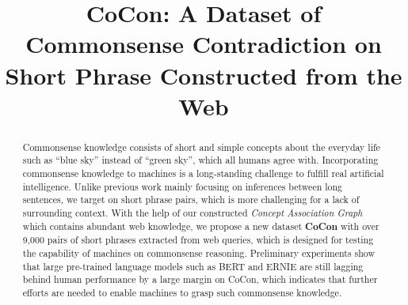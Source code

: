 \documentclass[sigconf]{acmart}
\newcommand{\KZ}[1]{\textcolor{red}{Kenny: #1}}
\begin{document}
	\fancyhead{}
	\title{CoCon: A Dataset of Commonsense Contradiction on Short Phrase Constructed from the Web}
	

	
	\renewcommand{\shortauthors}{Trovato and Tobin, et al.}
	
	\begin{abstract}
		Commonsense knowledge consists of short and simple concepts about the everyday life such as ``blue sky'' instead of ``green sky'', which all humans agree with.
		Incorporating commonsense knowledge to machines is a long-standing challenge to fulfill real artificial intelligence.
		Unlike previous work mainly focusing on inferences between long sentences, we target on short phrase pairs, which is more challenging for a lack of surrounding context. 
		With the help of our constructed \textit{Concept Association Graph} which contains abundant web knowledge, 
		we propose a new dataset \textbf{CoCon} with over 9,000 pairs of short phrases extracted from web queries, which is designed for testing the capability of machines on commonsense reasoning.
		Preliminary experiments show that large pre-trained language models such as BERT and ERNIE are still lagging behind human performance by a large margin on CoCon, which indicates that further efforts are needed to enable machines to grasp such commonsense knowledge. 
	\end{abstract}
	
\end{document}
